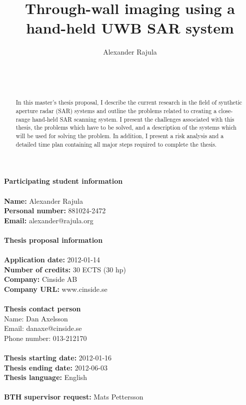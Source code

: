 \documentclass{chi2012}
\begin{document}
\textbf{\large{Participating student information}}
\\\\
\textbf{Name:} Alexander Rajula
\\
\textbf{Personal number:} 881024-2472
\\
\textbf{Email:} alexander@rajula.org
\\\\
\textbf{\large{Thesis proposal information}}
\\\\
\textbf{Application date:} 2012-01-14
\\
\textbf{Number of credits:} 30 ECTS (30 hp)
\\
\textbf{Company:} Cinside AB
\\
\textbf{Company URL:} www.cinside.se
\\\\
\textbf{Thesis contact person}
\\
\indent Name: Dan Axelsson
\\
\indent Email: danaxe@cinside.se
\\
\indent Phone number: 013-212170
\\\\
\textbf{Thesis starting date:} 2012-01-16
\\
\textbf{Thesis ending date:} 2012-06-03
\\
\textbf{Thesis language:} English
\\\\
\textbf{BTH supervisor request:} Mats Pettersson

\newpage

\toappear{}

\title{Through-wall imaging using a hand-held UWB SAR system}
\author{
  \alignauthor Alexander Rajula\\
    \\
    \\
    \\
}

\maketitle

\begin{abstract}
In this master's thesis proposal, I describe the current research in the field of synthetic aperture radar (SAR) systems and outline the problems related to creating a close-range hand-held SAR scanning system. I present the challenges associated with this thesis, the problems which have to be solved, and a description of the systems which will be used for solving the problem. In addition, I present a risk analysis and a detailed time plan containing all major steps required to complete the thesis.
\end{abstract}
\end{document}
